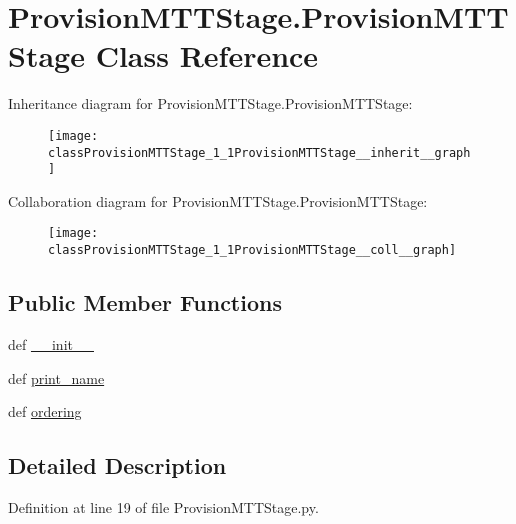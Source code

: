 \hypertarget{classProvisionMTTStage_1_1ProvisionMTTStage}{\section{Provision\-M\-T\-T\-Stage.\-Provision\-M\-T\-T\-Stage Class Reference}
\label{classProvisionMTTStage_1_1ProvisionMTTStage}
}


Inheritance diagram for Provision\-M\-T\-T\-Stage.\-Provision\-M\-T\-T\-Stage\-:\nopagebreak
\begin{figure}[H]
\begin{center}
\leavevmode
\texttt{[image: classProvisionMTTStage\_1\_1ProvisionMTTStage\_\_inherit\_\_graph]}
\end{center}
\end{figure}


Collaboration diagram for Provision\-M\-T\-T\-Stage.\-Provision\-M\-T\-T\-Stage\-:\nopagebreak
\begin{figure}[H]
\begin{center}
\leavevmode
\texttt{[image: classProvisionMTTStage\_1\_1ProvisionMTTStage\_\_coll\_\_graph]}
\end{center}
\end{figure}
\subsection*{Public Member Functions}
\begin{DoxyCompactItemize}
\item 
def \hyperlink{classProvisionMTTStage_1_1ProvisionMTTStage_a89f15901dadaf589dad17251fccdae4f}{\-\_\-\-\_\-init\-\_\-\-\_\-}
\item 
def \hyperlink{classProvisionMTTStage_1_1ProvisionMTTStage_a9baa3e9d2891ae662c8457c3a9d07379}{print\-\_\-name}
\item 
def \hyperlink{classProvisionMTTStage_1_1ProvisionMTTStage_abf0b58bc5d52d1176ce4809d3e905b42}{ordering}
\end{DoxyCompactItemize}


\subsection{Detailed Description}


Definition at line 19 of file Provision\-M\-T\-T\-Stage.\-py.



